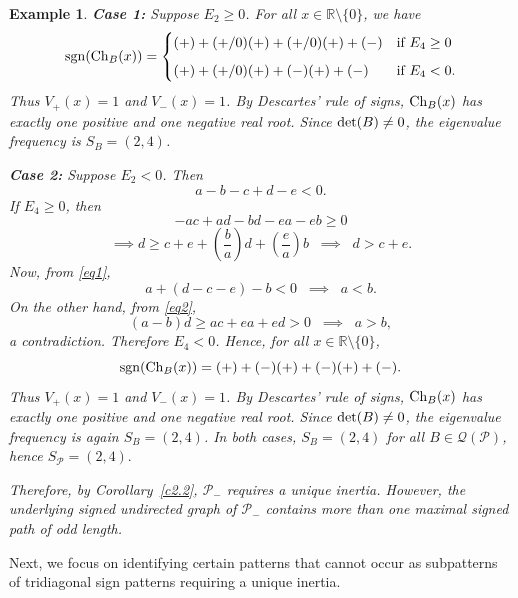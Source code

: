\documentclass[a4paper, 10pt]{article}
\newtheorem{eg}{Example}[section]
\numberwithin{equation}{section}
\def\det{{\rm det}}
\def\sgn{{\rm sgn}}
\def\Ch{{\rm Ch}}
\begin{document}
\begin{eg}
	\textbf{Case 1:} Suppose $E_2 \geq 0$.  
	For all $x \in \mathbb{R} \setminus \{0\}$, we have
	\[
	\sgn(\Ch_{B}(x)) = 
	\begin{cases} 
		(+)+(+/0)(+)+(+/0)(+)+(-) & \text{if } E_4 \geq 0 \\[6pt]
		(+)+(+/0)(+)+(-)(+)+(-) & \text{if } E_4 < 0.
	\end{cases}
	\]
	Thus $V_+(x) = 1$ and $V_-(x) = 1$. By Descartes' rule of signs, $\Ch_B(x)$ has exactly one positive and one negative real root. Since $\det(B) \neq 0$, the eigenvalue frequency is $S_B = (2,4)$.
	
	\medskip
	
	\textbf{Case 2:} Suppose $E_2 < 0$. Then
	\begin{equation} \label{eq1}
		a - b - c + d - e < 0.
	\end{equation}
	If $E_4 \geq 0$, then
	\begin{equation} \label{eq2}
		-ac + ad - bd - ea - eb \geq 0
	\end{equation}
	\[
	\implies d \geq c+e+\left(\frac{b}{a}\right)d+\left(\frac{e}{a}\right)b 
	\;\;\implies\;\; d > c+e.
	\]
	Now, from \eqref{eq1},
	\[
	a+(d-c-e)-b < 0 \;\;\implies\;\; a < b.
	\]
	On the other hand, from \eqref{eq2},
	\[
	(a-b)d \geq ac+ea+ed > 0 \;\;\implies\;\; a > b,
	\]
	a contradiction. Therefore $E_4 < 0$.
	Hence, for all $x \in \mathbb{R} \setminus \{0\}$,
	\[
	\sgn(\Ch_{B}(x)) = (+)+(-)(+)+(-)(+)+(-).
	\]
	Thus $V_+(x) = 1$ and $V_-(x) = 1$. By Descartes' rule of signs, $\Ch_B(x)$ has exactly one positive and one negative real root. Since $\det(B) \neq 0$, the eigenvalue frequency is again $S_B = (2,4)$.
	In both cases, $S_B = (2,4)$ for all $B \in \mathcal{Q}(\mathcal{P})$, hence
	$
	S_{\mathcal{P}} = (2,4).
	$
	
	Therefore, by Corollary~\ref{c2.2}, $\mathcal{P}_-$ requires a unique inertia. However, the underlying signed undirected graph of $\mathcal{P}_-$ contains more than one maximal signed path of odd length.
\end{eg}









Next, we focus on identifying certain patterns that cannot occur as subpatterns of tridiagonal sign patterns requiring a unique inertia.
\end{document}
